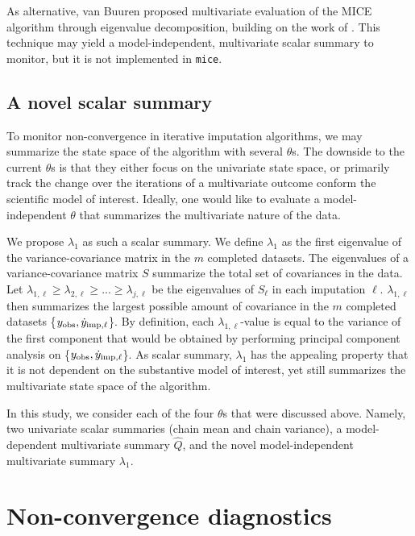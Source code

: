 \documentclass[Royal,times,sageh]{sagej}
\begin{document}
As alternative, van Buuren \citeyearpar[\(\S\) 4.5.2]{buur18} proposed multivariate evaluation of the MICE algorithm through eigenvalue decomposition, building on the work of \citet{mack03}. This technique may yield a model-independent, multivariate scalar summary to monitor, but it is not implemented in \texttt{mice}.

\hypertarget{a-novel-scalar-summary}{%
\subsection{A novel scalar summary}\label{a-novel-scalar-summary}}

To monitor non-convergence in iterative imputation algorithms, we may summarize the state space of the algorithm with several \(\theta\)s. The downside to the current \(\theta\)s is that they either focus on the univariate state space, or primarily track the change over the iterations of a multivariate outcome conform the scientific model of interest. Ideally, one would like to evaluate a model-independent \(\theta\) that summarizes the multivariate nature of the data.

We propose \(\lambda_{1}\) as such a scalar summary. We define \(\lambda_{1}\) as the first eigenvalue of the variance-covariance matrix in the \(m\) completed datasets. The eigenvalues of a variance-covariance matrix \(S\) summarize the total set of covariances in the data. Let \(\lambda_{1, \ell} \geq \lambda_{2, \ell} \geq ... \geq \lambda_{j, \ell}\) be the eigenvalues of \(S_\ell\) in each imputation \(\ell\). \(\lambda_{1,\ell}\) then summarizes the largest possible amount of covariance in the \(m\) completed datasets \{\(y_{\rm obs}, \dot y_{\rm imp, \ell}\)\}. By definition, each \(\lambda_{1, \ell}\)-value is equal to the variance of the first component that would be obtained by performing principal component analysis on \{\(y_{\rm obs}, \dot y_{\rm imp, \ell}\)\}. As scalar summary, \(\lambda_{1}\) has the appealing property that it is not dependent on the substantive model of interest, yet still summarizes the multivariate state space of the algorithm. \newline

\noindent In this study, we consider each of the four \(\theta\)s that were discussed above. Namely, two univariate scalar summaries (chain mean and chain variance), a model-dependent multivariate summary \(\hat{Q}\), and the novel model-independent multivariate summary \(\lambda_1\).

\hypertarget{non-convergence-diagnostics}{%
\section{Non-convergence diagnostics}\label{non-convergence-diagnostics}}
\end{document}

